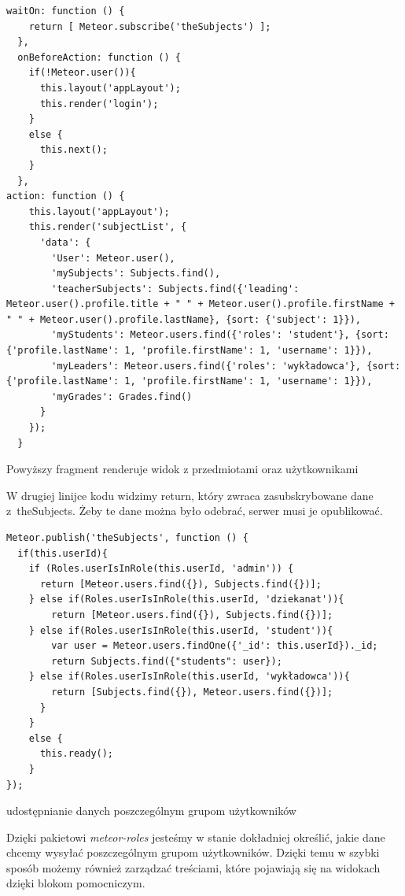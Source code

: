 \documentclass[openright]{xmgr}
\begin{document}
\begin{listing}[H]
\begin{verbatim}
waitOn: function () {
    return [ Meteor.subscribe('theSubjects') ];
  },
  onBeforeAction: function () {
    if(!Meteor.user()){
      this.layout('appLayout');
      this.render('login');
    }
    else {
      this.next();
    }
  },
action: function () {
    this.layout('appLayout');
    this.render('subjectList', {
      'data': {
        'User': Meteor.user(),
        'mySubjects': Subjects.find(),
        'teacherSubjects': Subjects.find({'leading': Meteor.user().profile.title + " " + Meteor.user().profile.firstName + " " + Meteor.user().profile.lastName}, {sort: {'subject': 1}}),
        'myStudents': Meteor.users.find({'roles': 'student'}, {sort: {'profile.lastName': 1, 'profile.firstName': 1, 'username': 1}}),
        'myLeaders': Meteor.users.find({'roles': 'wykładowca'}, {sort: {'profile.lastName': 1, 'profile.firstName': 1, 'username': 1}}),
        'myGrades': Grades.find()
      }
    });
  }
\end{verbatim}
\caption{Powyższy fragment renderuje widok z przedmiotami oraz użytkownikami}
\end{listing}

W drugiej linijce kodu widzimy return, który zwraca zasubskrybowane dane z~theSubjects. Żeby te dane można było odebrać, serwer musi je opublikować.

\begin{listing}[H]
\begin{verbatim}
Meteor.publish('theSubjects', function () {
  if(this.userId){
    if (Roles.userIsInRole(this.userId, 'admin')) {
      return [Meteor.users.find({}), Subjects.find({})];
    } else if(Roles.userIsInRole(this.userId, 'dziekanat')){
        return [Meteor.users.find({}), Subjects.find({})];
    } else if(Roles.userIsInRole(this.userId, 'student')){
        var user = Meteor.users.findOne({'_id': this.userId})._id;
        return Subjects.find({"students": user});
    } else if(Roles.userIsInRole(this.userId, 'wykładowca')){
        return [Subjects.find({}), Meteor.users.find({})];
      }
    }
    else {
      this.ready();
    }
});
\end{verbatim}
\caption{udostępnianie danych poszczególnym grupom użytkowników}
\end{listing}

Dzięki pakietowi \textit{meteor-roles} jesteśmy w stanie dokładniej określić, jakie dane chcemy wysyłać poszczególnym grupom użytkowników. Dzięki temu w szybki sposób możemy również zarządzać treściami, które pojawiają się na widokach dzięki blokom pomocniczym.
\end{document}
